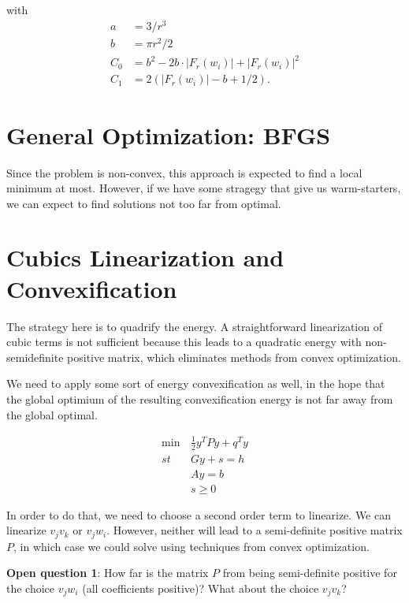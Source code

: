 	with 
	\begin{align*}
		a &= 3/r^3 \\ 
		b &= \pi r^2/2 \\ 
		C_0 &= b^2 - 2b \cdot |F_r(w_i)| + |F_r(w_i)|^2 \\
		C_1 &= 2\left( |F_r(w_i)| - b + 1/2 \right).
	\end{align*}


\section{General Optimization: BFGS}
Since the problem is non-convex, this approach is expected to find a local minimum at most. However, if we have some stragegy that give us warm-starters, we can expect to find solutions not too far from optimal.

\section{Cubics Linearization and Convexification}
The strategy here is to quadrify the energy. A straightforward linearization of cubic terms is not sufficient because this leads to a quadratic energy with non-semidefinite positive matrix, which eliminates methods from convex optimization.

We need to apply some sort of energy convexification as well, in the hope that the global optimium of the resulting convexification energy is not far away from the global optimal.
	
	\begin{equation}
	\begin{aligned}
		\min &\frac{1}{2} y^TPy + q^Ty\\
		st \quad &Gy + s = h\\
		&Ay = b \\
		& s \geq 0
		\label{eq:quadratic-formulation}
	\end{aligned}
	\end{equation}
	
	In order to do that, we need to choose a second order term to linearize. We can linearize $v_jv_k$ or $v_jw_i$. However, neither will lead to a semi-definite positive matrix $P$, in which case we could solve using techniques from convex optimization.

	\textbf{Open question 1}: How far is the matrix $P$ from being semi-definite positive for the choice $v_jw_i$ (all coefficients positive)? What about the choice $v_jv_k$? \\
		
